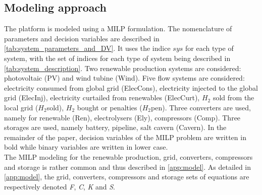 \subsection{Modeling approach} \label{Models}

The platform is modeled using a MILP formulation. The nomenclature of parameters and decision variables are described in \autoref{tab:system_parameters_and_DV}.
It uses the indice $sys$ for each type of system, with the set of indices for each type of system being described in \autoref{tab:system_description}.
Two renewable production systems are considered: photovoltaic (PV) and wind tubine (Wind). Five flow systems are considered: electricity consumed from global grid (ElecCons), electricity injected to the global grid (ElecInj), electricity curtailed from renewables (ElecCurt), $H_2$ sold from the local grid ($H_2$sold), $H_2$ bought or penalties ($H_2$pen).
Three converters are used, namely for renewable (Ren), electrolysers (Ely), compressors (Comp). Three storages are used, namely battery, pipeline, salt cavern (Cavern). In the remainder of the paper, decision variables of the MILP problem are written in bold while binary variables are written in lower case.\\
The MILP modeling for the renewable production, grid, converters, compressors and storage is rather common and thus described in \ref{app:model}. As detailed in \ref{app:model}, the grid, converters, compressors and storage sets of equations are respectively denoted \textit{F}, \textit{C}, \textit{K} and \textit{S}.

